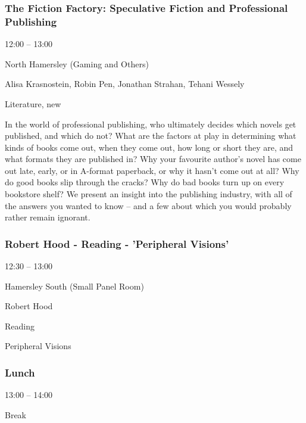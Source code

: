\documentclass{scrreprt}
\begin{document}
\begin{multicols}{2}
\subsubsection*{The Fiction Factory: Speculative Fiction and Professional Publishing}\begin{description}
\setlength{\itemsep}{0pt}
\setlength{\parsep}{0pt}
\setlength{\parskip}{0pt}
\item[Time:]{12:00 -- 13:00}
\item[Venue:]{North Hamersley (Gaming and Others)}
\item[People:]{Alisa Krasnostein, Robin Pen, Jonathan Strahan, Tehani Wessely}
\item[Tags:]{Literature, new}\end{description}
In the world of professional publishing, who ultimately decides which novels get published, and which do not? What are the factors at play in determining what kinds of books come out, when they come out, how long or short they are, and what formats they are published in? Why your favourite author’s novel has come out late, early, or in A-format paperback, or why it hasn’t come out at all? Why do good books slip through the cracks? Why do bad books turn up on every bookstore shelf? We present an insight into the publishing industry, with all of the answers you wanted to know – and a few about which you would probably rather remain ignorant.
\subsubsection*{Robert Hood - Reading -  'Peripheral Visions'}\begin{description}
\setlength{\itemsep}{0pt}
\setlength{\parsep}{0pt}
\setlength{\parskip}{0pt}
\item[Time:]{12:30 -- 13:00}
\item[Venue:]{Hamersley South (Small Panel Room)}
\item[People:]{Robert Hood}
\item[Tags:]{Reading}\end{description}
Peripheral Visions
\subsubsection*{Lunch}\begin{description}
\setlength{\itemsep}{0pt}
\setlength{\parsep}{0pt}
\setlength{\parskip}{0pt}
\item[Time:]{13:00 -- 14:00}
\item[Tags:]{Break}\end{description}


\end{multicols}
\end{document}
